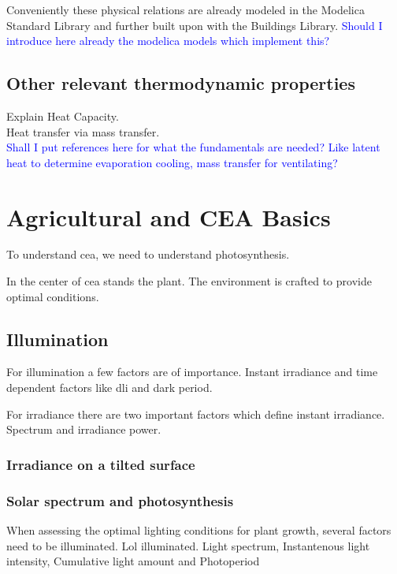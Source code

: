 Conveniently these physical relations are already modeled in the Modelica Standard Library and further built upon with the Buildings Library.
\textcolor{Blue}{Should I introduce here already the modelica models which implement this?}



\subsection{Other relevant thermodynamic properties}
\label{sub:ther-props}
Explain Heat Capacity.\\
Heat transfer via mass transfer.\\
\textcolor{Blue}{Shall I put references here for what the fundamentals are needed? Like latent heat to determine evaporation cooling, mass transfer for ventilating?}




\section{Agricultural and CEA Basics}
To understand \ac{cea}, we need to understand photosynthesis.

In the center of \ac{cea} stands the plant.
The environment is crafted to provide optimal conditions.

\subsection{Illumination}
For illumination a few factors are of importance.
Instant irradiance and time dependent factors like dli and dark period.

For irradiance there are two important factors which define instant irradiance.
Spectrum and irradiance power.
\subsubsection{Irradiance on a tilted surface}

\subsubsection{Solar spectrum and photosynthesis}
When assessing the optimal lighting conditions for plant growth, several factors need to be illuminated.
Lol illuminated.
Light spectrum, Instantenous light intensity, Cumulative light amount and Photoperiod

